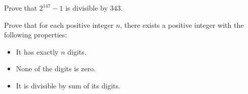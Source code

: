 
\begin{problem}
	Prove that $2^{147}-1$ is divisible by $343.$ %
\end{problem}


\begin{problem}[ISL 1998, NT7]
	Prove that for each positive integer $n$, there exists a positive integer with the following properties:
		\begin{itemize}
			\item It has exactly $n$ digits.
			\item None of the digits is zero.
			\item It is divisible by sum of its digits.
		\end{itemize}
\end{problem}

